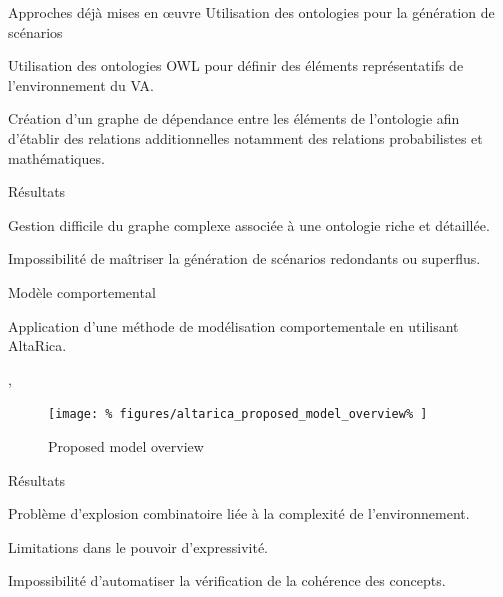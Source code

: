 \documentclass[
  hyperref={
    pdfusetitle,
    pdfencoding=auto,
    psdextra,
    colorlinks=true,
    linkcolor=darkblue,
    citecolor=darkred,
    urlcolor=darkblue,
  },
  9pt,
  aspectratio=169,
]{beamer}
\begin{document}
\begin{frame}[allowframebreaks]{Approches déjà mises en œuvre}
  \alert{Utilisation des ontologies pour la génération de scénarios}

  Utilisation des ontologies \gls{OWL} pour définir des éléments représentatifs de l'environnement du \gls{VA}.

  Création d'un graphe de dépendance
  entre les éléments de l'ontologie
  afin d'établir des relations additionnelles
  notamment des relations probabilistes et mathématiques.

  \alert{Résultats}

  Gestion difficile du graphe complexe
  associée à une ontologie riche et détaillée.

  Impossibilité de maîtriser la génération
  de scénarios redondants ou superflus.

  \framebreak{}



  \alert{Modèle comportemental}

  Application d'une méthode de modélisation comportementale
  en utilisant AltaRica.

  \citeauthor{tlig-2018-autonomous}
  ,
  \citeyear{tlig-2018-autonomous}

  \framebreak{}

  \begin{figure}
    \centering
    \texttt{[image: \%
      figures/altarica\_proposed\_model\_overview\%
    ]}
    \caption{%
      \label{fig-altarica-proposed-model-overview}%
      Proposed model overview~\cite[2]{tlig-2018-autonomous}%
    }
  \end{figure}

  \alert{Résultats}

  Problème d'explosion combinatoire liée à la complexité de l'environnement.

  Limitations dans le pouvoir d'expressivité.

  Impossibilité d'automatiser la vérification de
  la cohérence des concepts.

\end{frame}
\end{document}
